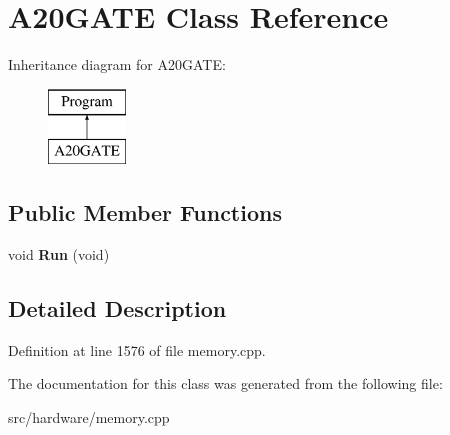 \hypertarget{classA20GATE}{\section{A20\-G\-A\-T\-E Class Reference}
\label{classA20GATE}
}
Inheritance diagram for A20\-G\-A\-T\-E\-:\begin{figure}[H]
\begin{center}
\leavevmode
\includegraphics[height=2.000000cm]{classA20GATE}
\end{center}
\end{figure}
\subsection*{Public Member Functions}
\begin{DoxyCompactItemize}
\item 
\hypertarget{classA20GATE_a7d53ddb7d6453f710b7e829b5c0f6ca3}{void {\bfseries Run} (void)}\label{classA20GATE_a7d53ddb7d6453f710b7e829b5c0f6ca3}

\end{DoxyCompactItemize}


\subsection{Detailed Description}


Definition at line 1576 of file memory.\-cpp.



The documentation for this class was generated from the following file\-:\begin{DoxyCompactItemize}
\item 
src/hardware/memory.\-cpp\end{DoxyCompactItemize}
